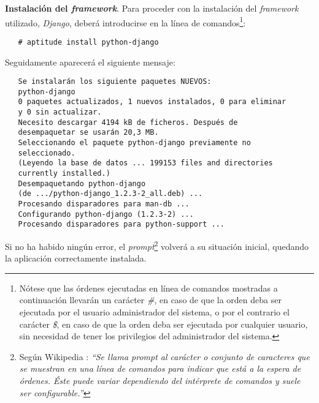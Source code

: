 \item \textbf{Instalación del \textit{framework}}.
   Para proceder con la instalación del \textit{framework} utilizado,
   \textit{Django}, deberá introducirse en la línea de
   comandos\footnote{Nótese que las órdenes ejecutadas en línea de comandos
   mostradas a continuación llevarán un carácter \textit{\#}, en caso de que la
   orden deba ser ejecutada por el usuario administrador del sistema, o por el
   contrario el carácter \textit{\$}, en caso de que la orden deba ser ejecutada
   por cualquier usuario, sin necesidad de tener los privilegios del
   administrador del sistema.}:

   \begin{verbatim}
   # aptitude install python-django
   \end{verbatim}

   Seguidamente aparecerá el siguiente mensaje:

   \begin{verbatim}
   Se instalarán los siguiente paquetes NUEVOS:
   python-django
   0 paquetes actualizados, 1 nuevos instalados, 0 para eliminar
   y 0 sin actualizar.
   Necesito descargar 4194 kB de ficheros. Después de
   desempaquetar se usarán 20,3 MB.
   Seleccionando el paquete python-django previamente no
   seleccionado.
   (Leyendo la base de datos ... 199153 files and directories
   currently installed.)
   Desempaquetando python-django
   (de .../python-django_1.2.3-2_all.deb) ...
   Procesando disparadores para man-db ...
   Configurando python-django (1.2.3-2) ...
   Procesando disparadores para python-support ...
   \end{verbatim}

   Si no ha habido ningún error, el \textit{prompt}\footnote{Según Wikipedia
   \cite{wikipedia2}: \textit{``Se llama prompt al carácter o conjunto de
   caracteres que se muestran en una línea de comandos para indicar que está a
   la espera de órdenes. Éste puede variar dependiendo del intérprete de
   comandos y suele ser configurable.''}} volverá a su situación inicial,
   quedando la aplicación correctamente instalada.